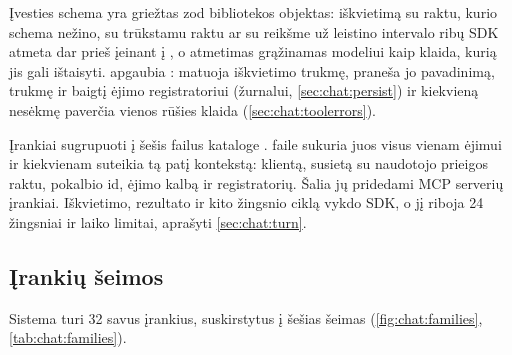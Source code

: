 Įvesties schema yra griežtas zod bibliotekos objektas: iškvietimą su raktu, kurio schema nežino,
su trūkstamu raktu ar su reikšme už leistino intervalo ribų SDK atmeta dar prieš įeinant į
, o atmetimas grąžinamas modeliui kaip klaida, kurią jis gali ištaisyti.
 apgaubia : matuoja iškvietimo trukmę, praneša jo pavadinimą, trukmę
ir baigtį ėjimo registratoriui (žurnalui, \cref{sec:chat:persist}) ir kiekvieną nesėkmę paverčia
vienos rūšies klaida (\cref{sec:chat:toolerrors}).

Įrankiai sugrupuoti į šešis failus kataloge .  faile
 sukuria juos visus vienam ėjimui ir kiekvienam suteikia tą patį kontekstą:
klientą, susietą su naudotojo prieigos raktu, pokalbio id, ėjimo kalbą ir registratorių. Šalia jų
pridedami MCP serverių įrankiai. Iškvietimo, rezultato ir kito žingsnio ciklą vykdo SDK, o jį
riboja 24 žingsniai ir laiko limitai, aprašyti \cref{sec:chat:turn}.

\subsection{Įrankių šeimos}\label{sec:chat:families}

Sistema turi 32 savus įrankius, suskirstytus į šešias šeimas (\cref{fig:chat:families},
\cref{tab:chat:families}).

